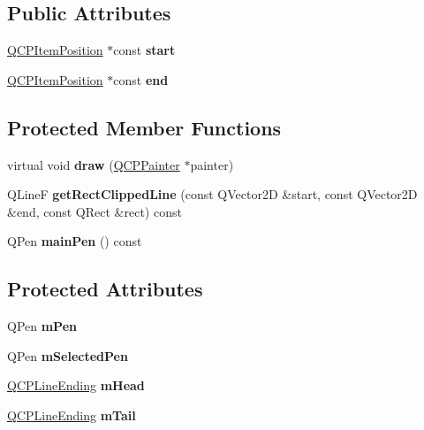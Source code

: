 \subsection*{Public Attributes}
\begin{DoxyCompactItemize}
\item 
\mbox{\label{class_q_c_p_item_line_a602da607a09498b0f152ada1d6851bc5}} 
\mbox{\hyperlink{class_q_c_p_item_position}{Q\+C\+P\+Item\+Position}} $\ast$const {\bfseries start}
\item 
\mbox{\label{class_q_c_p_item_line_a15598864c1c22a2497a1979c4980c4e1}} 
\mbox{\hyperlink{class_q_c_p_item_position}{Q\+C\+P\+Item\+Position}} $\ast$const {\bfseries end}
\end{DoxyCompactItemize}
\subsection*{Protected Member Functions}
\begin{DoxyCompactItemize}
\item 
\mbox{\label{class_q_c_p_item_line_a1fc045dd33919f8006df0692aeb0e84a}} 
virtual void {\bfseries draw} (\mbox{\hyperlink{class_q_c_p_painter}{Q\+C\+P\+Painter}} $\ast$painter)
\item 
\mbox{\label{class_q_c_p_item_line_ae61e504ad3b94aa86bfd02f734fb17b0}} 
Q\+LineF {\bfseries get\+Rect\+Clipped\+Line} (const Q\+Vector2D \&start, const Q\+Vector2D \&end, const Q\+Rect \&rect) const
\item 
\mbox{\label{class_q_c_p_item_line_af8b5370462515b279578d8b4a57bd3b4}} 
Q\+Pen {\bfseries main\+Pen} () const
\end{DoxyCompactItemize}
\subsection*{Protected Attributes}
\begin{DoxyCompactItemize}
\item 
\mbox{\label{class_q_c_p_item_line_abbb544d5bb927dfe4e81a7f3ca4c65ac}} 
Q\+Pen {\bfseries m\+Pen}
\item 
\mbox{\label{class_q_c_p_item_line_aff858ad6dde3b90024814ca4b116f278}} 
Q\+Pen {\bfseries m\+Selected\+Pen}
\item 
\mbox{\label{class_q_c_p_item_line_a51603f28ab7ddb1c1a95ea384791d3ed}} 
\mbox{\hyperlink{class_q_c_p_line_ending}{Q\+C\+P\+Line\+Ending}} {\bfseries m\+Head}
\item 
\mbox{\label{class_q_c_p_item_line_ab8ed61dfe15bbb1cbf9b95eae95e242f}} 
\mbox{\hyperlink{class_q_c_p_line_ending}{Q\+C\+P\+Line\+Ending}} {\bfseries m\+Tail}
\end{DoxyCompactItemize}

